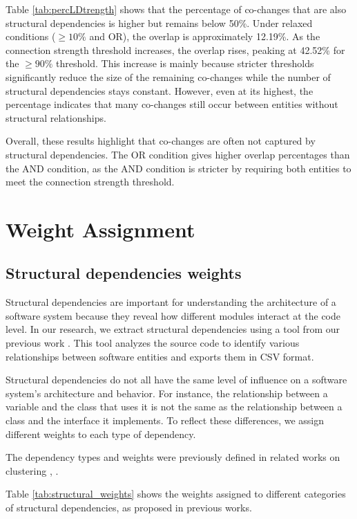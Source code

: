 Table \ref{tab:percLDtrength} shows that the percentage of co-changes that are also structural dependencies is higher but remains below 50\%. Under relaxed conditions (\(\geq 10\%\) and OR), the overlap is approximately 12.19\%. As the connection strength threshold increases, the overlap rises, peaking at 42.52\% for the \(\geq 90\%\) threshold. This increase is mainly because stricter thresholds significantly reduce the size of the remaining co-changes while the number of structural dependencies stays constant. However, even at its highest, the percentage indicates that many co-changes still occur between entities without structural relationships.

Overall, these results highlight that co-changes are often not captured by structural dependencies. The OR condition gives higher overlap percentages than the AND condition, as the AND condition is stricter by requiring both entities to meet the connection strength threshold.

\section{Weight Assignment}
\label{sec:weight_assignment}

\subsection{Structural dependencies weights}
\label{subsec:structural_weights}

Structural dependencies are important for understanding the architecture of a software system because they reveal how different modules interact at the code level. In our research, we extract structural dependencies using a tool from our previous work \cite{b4}. This tool analyzes the source code to identify various relationships between software entities and exports them in CSV format.

Structural dependencies do not all have the same level of influence on a software system’s architecture and behavior. For instance, the relationship between a variable and the class that uses it is not the same as the relationship between a class and the interface it implements. To reflect these differences, we assign different weights to each type of dependency.

The dependency types and weights were previously defined in related works on clustering \cite{SoraConti}, \cite{Finding-key-classes}.

Table \ref{tab:structural_weights} shows the weights assigned to different categories of structural dependencies, as proposed in previous works.

